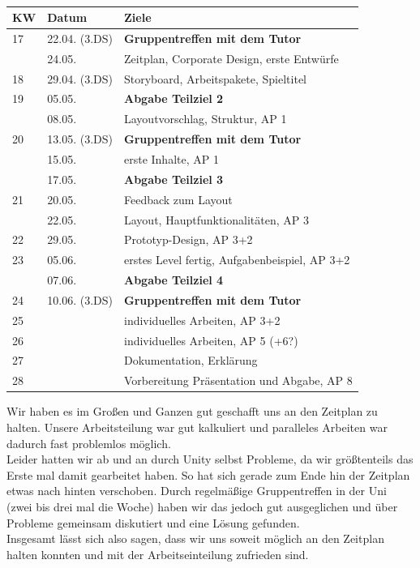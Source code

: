\documentclass[10pt,a4paper,notitlepage]{report}
\begin{document}
	\\\par\medskip\Text
\begin{center}
		\begin{tabular}{l|l|l}\hline
 	 KW & Datum & Ziele\\\hline
	17 & 22.04. (3.DS) & \textbf{Gruppentreffen mit dem Tutor}\\
	& 24.05. & Zeitplan, Corporate Design, erste Entwürfe\\\hline
	18 & 29.04. (3.DS) &  Storyboard, Arbeitspakete, Spieltitel\\\hline
	19 & 05.05. & \textbf{Abgabe Teilziel 2}\\
	& 08.05.& Layoutvorschlag, Struktur, AP 1\\\hline
	20 & 13.05. (3.DS) & \textbf{Gruppentreffen mit dem Tutor}\\
	& 15.05. & erste Inhalte, AP 1\\
	& 17.05. & \textbf{Abgabe Teilziel 3}\\\hline
	21 & 20.05. & Feedback zum Layout\\
	& 22.05. & Layout, Hauptfunktionalitäten, AP 3\\\hline
	22 & 29.05. & Prototyp-Design, AP 3+2 \\\hline
	23 & 05.06. & erstes Level fertig, Aufgabenbeispiel, AP 3+2\\
	& 07.06. & \textbf{Abgabe Teilziel 4}\\\hline
	24 & 10.06. (3.DS) & \textbf{Gruppentreffen mit dem Tutor}\\\hline
	25 & & individuelles Arbeiten, AP 3+2\\\hline
	26 & & individuelles Arbeiten, AP 5 (+6?)\\\hline
	27 & & Dokumentation, Erklärung\\\hline
	28 & & Vorbereitung Präsentation und Abgabe, AP 8\\\hline
	\end{tabular}
	\end{center}
	\par\bigskip
	Wir haben es im Großen und Ganzen gut geschafft uns an den Zeitplan zu halten. Unsere Arbeitsteilung war gut kalkuliert und paralleles Arbeiten war dadurch fast problemlos möglich.\\
	Leider hatten wir ab und an durch Unity selbst Probleme, da wir größtenteils das Erste mal damit gearbeitet haben. So hat sich gerade zum Ende hin der Zeitplan etwas nach hinten verschoben. Durch regelmäßige Gruppentreffen in der Uni (zwei bis drei mal die Woche) haben wir das jedoch gut ausgeglichen und über Probleme gemeinsam diskutiert und eine Lösung gefunden.\\
	Insgesamt lässt sich also sagen, dass wir uns soweit möglich an den Zeitplan halten konnten und mit der Arbeitseinteilung zufrieden sind.\\\par\smallskip
	
\end{document}
